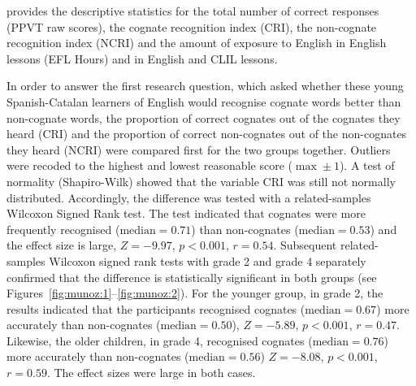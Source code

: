 \documentclass[output=paper,modfonts,nonflat,newtxmath]{langsci/langscibook}
\begin{document}
 provides the descriptive statistics for the total number of correct responses (PPVT raw scores), the cognate recognition index (CRI), the non-cognate recognition index (NCRI) and the amount of exposure to English in English lessons (EFL Hours) and in English and CLIL lessons.


\begin{table}
\caption{Descriptive statistics}
\label{tab:munoz:1}
\end{table}

In order to answer the first research question, which asked whether these young Spanish-Catalan learners of English would recognise cognate words better than non-cognate words, the proportion of correct cognates out of the cognates they heard (CRI) and the proportion of correct non-cognates out of the non-cognates they heard (NCRI) were compared first for the two groups together. Outliers were recoded to the highest and lowest reasonable score ($\max\pm 1$). A test of normality (Shapiro-Wilk) showed that the variable CRI was still not normally distributed. Accordingly, the difference was tested with a related-samples Wilcoxon Signed Rank test. The test indicated that cognates were more frequently recognised ($\text{median} = 0.71$) than non-cognates ($\text{median} = 0.53$) and the effect size is large, $Z = -9.97$,  $p < 0.001$, $r = 0.54$. Subsequent related-samples Wilcoxon signed rank tests with grade 2 and grade 4 separately confirmed that the difference is statistically significant in both groups (see Figures~\ref{fig:munoz:1}--\ref{fig:munoz:2}). For the younger group, in grade 2, the results indicated that the participants recognised cognates ($\text{median} = 0.67$) more accurately than non-cognates ($\text{median} = 0.50$), $Z = -5.89$, $p < 0.001$, $r = 0.47$. Likewise, the older children, in grade 4, recognised cognates ($\text{median} = 0.76$) more accurately than non-cognates ($\text{median} = 0.56$) $Z = -8.08$, $p < 0.001$, $r= 0.59$. The effect sizes were large in both cases.
\end{document}
